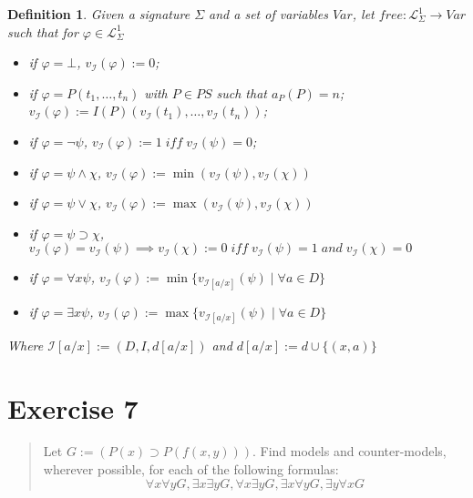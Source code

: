 \documentclass[11pt,a4paper]{article}
\newtheorem{mydef}{Definition}
\begin{document}
\begin{mydef}
Given a signature $\Sigma$ and a set of variables $Var$, let $free:\mathcal{L}_{\Sigma}^1 \to Var$ such that for $\varphi \in \mathcal{L}_{\Sigma}^1$
\begin{itemize}
\item if $\varphi=\bot$, $v_{\mathcal{I}}(\varphi):=0$;
\item  if $\varphi=P(t_1,\dots,t_n)$ with $P \in PS$ such that $a_P(P)=n$; $v_{\mathcal{I}}(\varphi):= I(P)(v_{\mathcal{I}}(t_1),\dots,v_{\mathcal{I}}(t_n))$;
\item if $\varphi=\neg \psi$, $v_{\mathcal{I}}(\varphi):= 1 \;\mathit{ iff } \;v_{\mathcal{I}}(\psi)=0$;
\item if $\varphi=\psi \land \chi$, $v_{\mathcal{I}}(\varphi):=\min(v_{\mathcal{I}}(\psi),v_{\mathcal{I}}(\chi))$
\item if $\varphi=\psi \lor \chi$, $v_{\mathcal{I}}(\varphi):=\max(v_{\mathcal{I}}(\psi),v_{\mathcal{I}}(\chi))$
\item if $\varphi=\psi \supset \chi$, $v_{\mathcal{I}}(\varphi)=v_{\mathcal{I}}(\psi) \implies v_{\mathcal{I}}(\chi):=0 \;\mathit{ iff }\; v_{\mathcal{I}}(\psi)=1 \;\mathit{ and }\; v_{\mathcal{I}}(\chi)=0$
\item if $\varphi=\forall x \psi$, $v_{\mathcal{I}}(\varphi):= \min\{ v_{\mathcal{I}[a/x]}(\psi) \mid \forall a \in D \}$
\item if $\varphi=\exists x \psi$, $v_{\mathcal{I}}(\varphi):= \max\{ v_{\mathcal{I}[a/x]}(\psi) \mid \forall a \in D \}$
\end{itemize}
Where $\mathcal{I}[a/x]:=(D,I,d[a/x])$ and $d[a/x]:=d\cup \{(x,a)\}$

\end{mydef}


\section*{Exercise 7}
\begin{quote}
Let $G:= (P(x) \supset P(f(x,y)))$. Find models and counter-models, wherever possible, for each of the following formulas: 
\begin{equation*}
\forall x \forall  y G,\exists x \exists  y G,\forall x \exists  y G,\exists x \forall  y G,\exists y \forall  x G
\end{equation*}
\end{quote}
\end{document}
